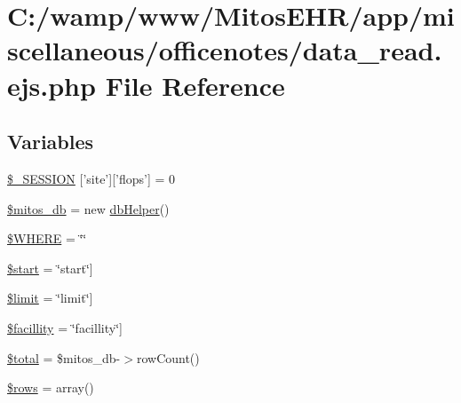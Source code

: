 \hypertarget{miscellaneous_2officenotes_2data__read_8ejs_8php}{\section{\-C\-:/wamp/www/\-Mitos\-E\-H\-R/app/miscellaneous/officenotes/data\-\_\-read.ejs.\-php \-File \-Reference}
\label{miscellaneous_2officenotes_2data__read_8ejs_8php}
}
\subsection*{\-Variables}
\begin{DoxyCompactItemize}
\item 
\hyperlink{miscellaneous_2officenotes_2data__read_8ejs_8php_a99fda8552a3e58235643b79f5af3ded8}{\$\-\_\-\-S\-E\-S\-S\-I\-O\-N} \mbox{[}'site'\mbox{]}\mbox{[}'flops'\mbox{]} = 0
\item 
\hyperlink{miscellaneous_2officenotes_2data__read_8ejs_8php_ab5d961f93efe4e2e8d8374f01dd6c65a}{\$mitos\-\_\-db} = new \hyperlink{classdb_helper}{db\-Helper}()
\item 
\hyperlink{miscellaneous_2officenotes_2data__read_8ejs_8php_a4dd405a06389d35f29969f618b50364e}{\$\-W\-H\-E\-R\-E} = \char`\"{}\char`\"{}
\item 
\hyperlink{miscellaneous_2officenotes_2data__read_8ejs_8php_a50a00e7de77365e00b117e73aa82fb9b}{\$start} = \char`\"{}start\char`\"{}\mbox{]}
\item 
\hyperlink{miscellaneous_2officenotes_2data__read_8ejs_8php_ae05862a0294251c88629b141b5ce329a}{\$limit} = \char`\"{}limit\char`\"{}\mbox{]}
\item 
\hyperlink{miscellaneous_2officenotes_2data__read_8ejs_8php_afe86642f351a77eb05c12f8786532f9f}{\$facillity} = \char`\"{}facillity\char`\"{}\mbox{]}
\item 
\hyperlink{miscellaneous_2officenotes_2data__read_8ejs_8php_a241b818f48030b628685b2e5119c5624}{\$total} = \$mitos\-\_\-db-\/$>$row\-Count()
\item 
\hyperlink{miscellaneous_2officenotes_2data__read_8ejs_8php_ace2ec39e7df3899fa8df9640ec274b03}{\$rows} = array()
\end{DoxyCompactItemize}


